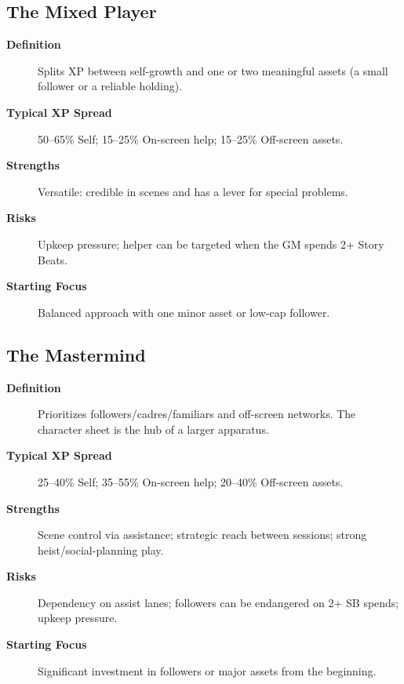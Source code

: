 \subsection{The Mixed Player}
\label{subsec:mixed-archetype}

\begin{description}
\item[\textbf{Definition}] Splits XP between self-growth and one or two meaningful assets (a small follower or a reliable holding).
\item[\textbf{Typical XP Spread}] 50--65\% Self; 15--25\% On-screen help; 15--25\% Off-screen assets.
\item[\textbf{Strengths}] Versatile: credible in scenes and has a lever for special problems.
\item[\textbf{Risks}] Upkeep pressure; helper can be targeted when the GM spends 2+ Story Beats.
\item[\textbf{Starting Focus}] Balanced approach with one minor asset or low-cap follower.
\end{description}

\subsection{The Mastermind}
\label{subsec:mastermind-archetype}

\begin{description}
\item[\textbf{Definition}] Prioritizes followers/cadres/familiars and off-screen networks. The character sheet is the hub of a larger apparatus.
\item[\textbf{Typical XP Spread}] 25--40\% Self; 35--55\% On-screen help; 20--40\% Off-screen assets.
\item[\textbf{Strengths}] Scene control via assistance; strategic reach between sessions; strong heist/social-planning play.
\item[\textbf{Risks}] Dependency on assist lanes; followers can be endangered on 2+ SB spends; upkeep pressure.
\item[\textbf{Starting Focus}] Significant investment in followers or major assets from the beginning.
\end{description}

